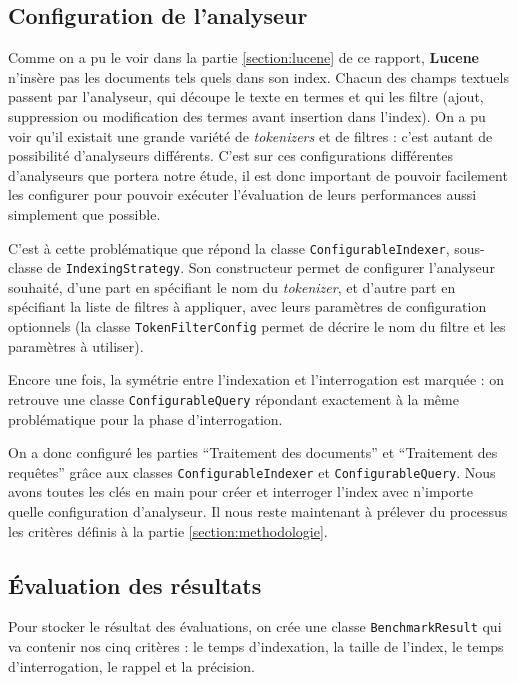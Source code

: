 \subsection{Configuration de l'analyseur}

Comme on a pu le voir dans la partie \ref{section:lucene} de ce rapport, \textbf{Lucene} n’insère pas les documents tels quels dans son index. Chacun des champs textuels passent par l’analyseur, qui découpe le texte en termes et qui les filtre (ajout, suppression ou modification des termes avant insertion dans l’index). On a pu voir qu’il existait une grande variété de \textit{tokenizers} et de filtres : c’est autant de possibilité d’analyseurs différents. C’est sur ces configurations différentes d’analyseurs que portera notre étude, il est donc important de pouvoir facilement les configurer pour pouvoir exécuter l’évaluation de leurs performances aussi simplement que possible.

C’est à cette problématique que répond la classe \texttt{Configurable\-Indexer}, sous-classe de \texttt{Index\-ing\-Strategy}. Son constructeur permet de configurer l’analyseur souhaité, d’une part en spécifiant le nom du \textit{tokenizer}, et d’autre part en spécifiant la liste de filtres à appliquer, avec leurs paramètres de configuration optionnels (la classe \texttt{TokenFilterConfig} permet de décrire le nom du filtre et les paramètres à utiliser).

Encore une fois, la symétrie entre l’indexation et l’interrogation est marquée : on retrouve une classe \texttt{ConfigurableQuery} répondant exactement à la même problématique pour la phase d’interrogation.

On a donc configuré les parties “Traitement des documents” et “Traitement des requêtes” grâce aux classes \texttt{ConfigurableIndexer} et \texttt{ConfigurableQuery}. Nous avons toutes les clés en main pour créer et interroger l’index avec n’importe quelle configuration d’analyseur. Il nous reste maintenant à prélever du processus les critères définis à la partie \ref{section:methodologie}.

\subsection{Évaluation des résultats}
\label{section:benchmarkresults}

Pour stocker le résultat des évaluations, on crée une classe \texttt{BenchmarkResult} qui va contenir nos cinq critères : le temps d’indexation, la taille de l’index, le temps d’interrogation, le rappel et la précision.


